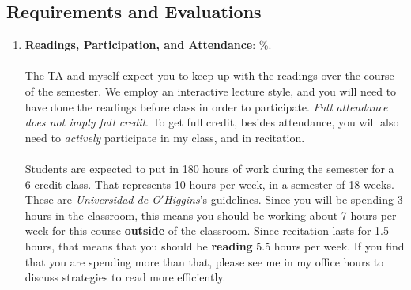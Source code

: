 \documentclass[letterpaper]{article}
\begin{document}
\subsection*{Requirements and Evaluations}

\begin{enumerate}

	\item {\bf Readings, Participation, and Attendance}: {\unskip}\%.
	\\
	\\
	The TA and myself expect you to keep up with the readings over the course of the semester. We employ an interactive lecture style, and you will need to have done the readings before class in order to participate. \emph{Full attendance does not imply full credit}. To get full credit, besides attendance, you will also need to \emph{actively} participate in my class, and in recitation.
	\\
	\\
	Students are expected to put in 180 hours of work during the semester for a 6-credit class. That represents 10 hours per week, in a semester of 18 weeks. These are \emph{Universidad de O$'$Higgins}'s guidelines. Since you will be spending 3 hours in the classroom, this means you should be working about 7 hours per week for this course {\bf outside} of the classroom. Since recitation lasts for 1.5 hours, that means that you should be {\bf reading} 5.5 hours per week. If you find that you are spending more than that, please see me in my office hours to discuss strategies to read more efficiently. 



\end{enumerate}
\end{document}
